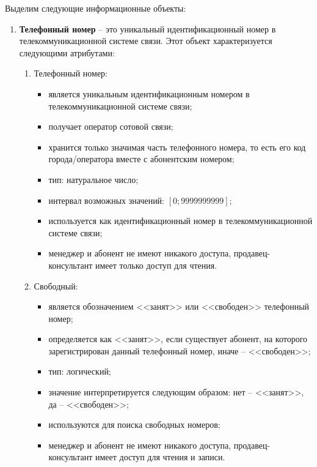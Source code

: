 Выделим следующие информационные объекты:
\begin{enumerate}
    \item \textbf{Телефонный номер} -- это уникальный идентификационный номер в телекоммуникационной системе связи. Этот объект характеризуется следующими атрибутами:
    \begin{enumerate}
        \item Телефонный номер:
        \begin{itemize}
            \item является уникальным идентификационным номером в телекоммуникационной системе связи;
            \item получает оператор сотовой связи;
            \item хранится только значимая часть телефонного номера, то есть его код города/оператора вместе с абонентским номером;
            \item тип: натуральное число;
            \item интервал возможных значений: $[0; 9 999 999 999]$;
            \item используется как идентификационный номер в телекоммуникационной системе связи;
            \item менеджер и абонент не имеют никакого доступа, продавец-консультант имеет только доступ для чтения.
        \end{itemize}

        \item Свободный:
        \begin{itemize}
            \item является обозначением <<занят>> или <<свободен>> телефонный номер;
            \item определяется как <<занят>>, если существует абонент, на которого зарегистрирован данный телефонный номер, иначе -- <<свободен>>;
            \item тип: логический;
            \item значение интерпретируется следующим образом: нет -- <<занят>>, да -- <<свободен>>;
            \item используются для поиска свободных номеров;
            \item менеджер и абонент не имеют никакого доступа, продавец-консультант имеет доступ для чтения и записи.
        \end{itemize}
    \end{enumerate}


\end{enumerate}

